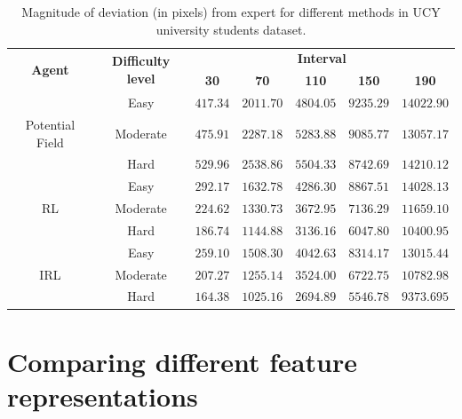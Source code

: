 \begin{table}[htbp]
	\begin{center}
		\renewcommand{\arraystretch}{1.3}
		\begin{tabular}{|c|c|c|c|c|c|c|}
			\hline
			 \multicolumn{1}{|c|}{\multirow{2}{*}{\textbf{Agent}}} & \multicolumn{1}{c|}{\multirow{2}{*}{\textbf{Difficulty level}}}  & \multicolumn{5}{c|}{\multirow{1}{*}{\textbf{Interval}}}\\ \cline{3-7}
				
			 && \textbf{30} & \textbf{70} & \textbf{110} & \textbf{150}  &  \textbf{190} \\
			\hline
								& Easy & $417.34$ & $2011.70$ & $4804.05$ & $9235.29$ & $14022.90$ \\ \cline{2-7}
			Potential Field & Moderate & $475.91$ & $2287.18$ & $5283.88$ & $9085.77$ & $13057.17$ \\  \cline{2-7}
								& Hard & $529.96$ & $2538.86$ & $5504.33$ & $8742.69$ & $14210.12$ \\
								\hline
		    	 & Easy & $292.17$ & $1632.78$ & $4286.30$ & $8867.51$ & $14028.13$ \\ \cline{2-7}
		    RL	 & Moderate & $224.62$ & $1330.73$ & $3672.95$ & $7136.29$ & $11659.10$ \\ \cline{2-7}
		    	 & Hard & $186.74$ & $1144.88$ & $3136.16$ & $6047.80$ & $10400.95$ \\
							 	\hline
						& Easy & $259.10$ & $1508.30$ & $4042.63$ & $8314.17$ & $13015.44$ \\ \cline{2-7}
				IRL  & Moderate & $207.27$ & $1255.14$ & $3524.00$ & $6722.75$ & $10782.98$ \\ \cline{2-7}
						& Hard & $164.38$ & $1025.16$ & $2694.89$ & $5546.78$ & $9373.695$ \\
			\hline
		\end{tabular}
	\end{center}
	\caption{Magnitude of deviation (in pixels) from expert for different methods in UCY university students dataset.}
	\label{tab:ucy_inter_method_drift_results}
\end{table}

\section{Comparing different feature representations}
\label{sec:comparing-other-featreps}
